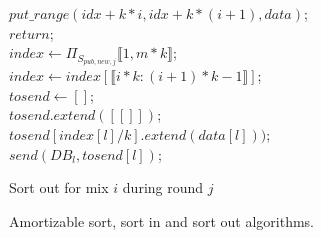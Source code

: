 \documentclass{llncs}
\begin{document}
\begin{figure}
\begin{minipage}[t]{0.475\textwidth}
\begin{algorithm}[H]
{
	$put\_range(idx+k*i, idx+k*(i+1), data)$;\\
	$return$;\\
}
$index \gets {\Pi}_{S_{pub,new,j}} \llbracket 1, m*k \rrbracket$;\\
$index \gets index[\llbracket i*k: (i+1)*k-1\rrbracket]$;\\
$tosend \gets []$;\\
{
	$tosend.extend([[]])$;\\
}
{
	$tosend[index[l]/k].extend(data[l]))$;\\
}
{
	$send(DB_l, tosend[l])$;\\
}
\caption{Sort out for mix $i$ during round $j$}
\label{alg:WAS}
\end{algorithm}
\end{minipage}
\caption{Amortizable sort, sort in and sort out algorithms.}
\end{figure}
\end{document}
